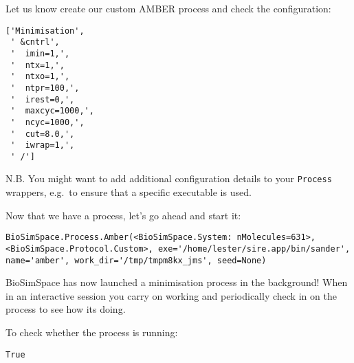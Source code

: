 Let us know create our custom AMBER process and check the configuration:

\begin{Shaded}
\begin{Highlighting}[]
 \OperatorTok{*}

\OperatorTok{=}
\end{Highlighting}
\end{Shaded}

\begin{verbatim}
['Minimisation',
 ' &cntrl',
 '  imin=1,',
 '  ntx=1,',
 '  ntxo=1,',
 '  ntpr=100,',
 '  irest=0,',
 '  maxcyc=1000,',
 '  ncyc=1000,',
 '  cut=8.0,',
 '  iwrap=1,',
 ' /']
\end{verbatim}

N.B. You might want to add additional configuration details to your
\texttt{Process} wrappers, e.g.~to ensure that a specific executable is
used.

Now that we have a process, let's go ahead and start it:

\begin{Shaded}
\begin{Highlighting}[]
\end{Highlighting}
\end{Shaded}

\begin{verbatim}
BioSimSpace.Process.Amber(<BioSimSpace.System: nMolecules=631>, <BioSimSpace.Protocol.Custom>, exe='/home/lester/sire.app/bin/sander', name='amber', work_dir='/tmp/tmpm8kx_jms', seed=None)
\end{verbatim}

BioSimSpace has now launched a minimisation process in the background!
When in an interactive session you carry on working and periodically
check in on the process to see how its doing.

To check whether the process is running:

\begin{Shaded}
\begin{Highlighting}[]
\end{Highlighting}
\end{Shaded}

\begin{verbatim}
True
\end{verbatim}

